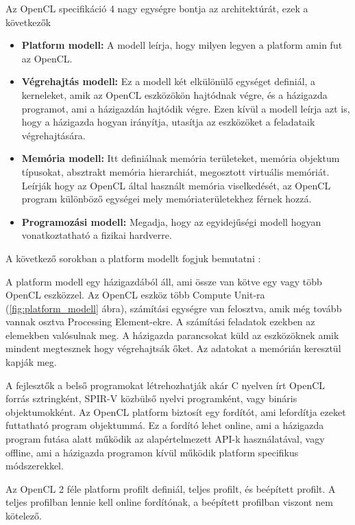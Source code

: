 Az OpenCL specifikáció 4 nagy egységre bontja az architektúrát, ezek a következők \cite{spec_archi}
\begin{itemize}
\item \textbf{Platform modell:} A modell leírja, hogy milyen legyen a platform amin fut az OpenCL. 
\item \textbf{Végrehajtás modell:} Ez a modell két elkülönülő egységet definiál, a kerneleket, amik az OpenCL eszközökön hajtódnak végre, és a házigazda programot, ami a házigazdán hajtódik végre. Ezen kívül a modell leírja azt is, hogy a házigazda hogyan irányítja, utasítja az eszközöket a feladataik végrehajtására.
\item \textbf{Memória modell:} Itt definiálnak memória területeket,  memória objektum típusokat, absztrakt memória hierarchiát, megosztott virtuális memóriát. Leírják hogy az OpenCL által használt memória viselkedését, az OpenCL program különböző egységei mely memóriaterületekhez férnek hozzá.
\item \textbf{Programozási modell:} Megadja, hogy az egyidejűségi modell hogyan vonatkoztatható a fizikai hardverre.

\end{itemize}

A következő sorokban a platform modellt fogjuk bemutatni \cite{spec_platform} :

A platform modell egy házigazdából áll, ami össze van kötve egy vagy több OpenCL eszközzel. Az OpenCL eszköz több Compute Unit-ra (\ref{fig:platform_modell} ábra), számítási egységre van felosztva, amik még tovább vannak osztva Processing Element-ekre. A számítási feladatok ezekben az elemekben valósulnak meg. A házigazda parancsokat küld az eszközöknek amik mindent megtesznek hogy végrehajtsák őket. Az adatokat a memórián keresztül kapják meg. 

A fejlesztők a belső programokat létrehozhatják akár C nyelven írt OpenCL forrás sztringként, SPIR-V közbülső nyelvi programként, vagy bináris objektumokként. Az OpenCL platform biztosít egy fordítót, ami lefordítja ezeket futtatható program objektummá. Ez a fordító lehet online, ami a házigazda program futása alatt működik az alapértelmezett API-k használatával, vagy offline, ami a házigazda programon kívül működik platform specifikus módszerekkel.

Az OpenCL 2 féle platform profilt definiál, teljes profilt, és beépített profilt. A teljes profilban lennie kell online fordítónak, a beépített profilban viszont nem kötelező.

